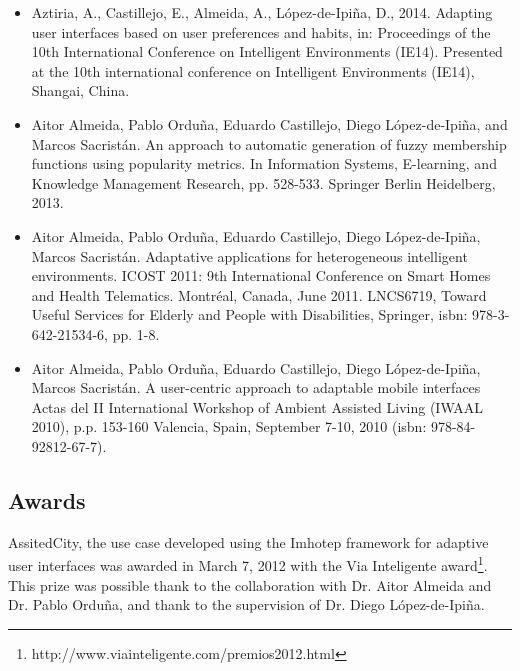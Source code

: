 \begin{itemize}
  \item Aztiria, A., Castillejo, E., Almeida, A., {López-de-Ipiña}, D., 2014. 
  Adapting user interfaces based on user preferences and habits, in: 
  Proceedings of the 10th International Conference on Intelligent Environments 
  (IE14). Presented at the 10th international conference on Intelligent 
  Environments (IE14), Shangai, China.


  \item Aitor Almeida, Pablo Orduña, Eduardo Castillejo, Diego {López-de-Ipiña}, 
  and Marcos Sacristán. An approach to automatic generation of fuzzy 
  membership functions using popularity metrics. In Information Systems, 
  E-learning, and Knowledge Management Research, pp. 528-533. Springer Berlin 
  Heidelberg, 2013.
  
  \item Aitor Almeida, Pablo Orduña, Eduardo Castillejo, Diego {López-de-Ipiña}, 
  Marcos Sacristán. Adaptative applications for heterogeneous intelligent 
  environments. ICOST 2011: 9th International Conference on Smart Homes and 
  Health Telematics. Montréal, Canada, June 2011. LNCS6719, Toward Useful 
  Services for Elderly and People with Disabilities, Springer, \ac{isbn}: 
  978-3-642-21534-6, pp. 1-8.
  
  \item Aitor Almeida, Pablo Orduña, Eduardo Castillejo, Diego {López-de-Ipiña}, 
  Marcos Sacristán. A user-centric approach to adaptable mobile interfaces 
  Actas del II International Workshop of Ambient Assisted Living (IWAAL 2010), 
  p.p. 153-160 Valencia, Spain, September 7-10, 2010 (\ac{isbn}: 978-84-92812-67-7).
\end{itemize}


\subsection{Awards}
\label{sec:awards}

AssitedCity, the use case developed using the Imhotep framework for adaptive
user interfaces was awarded in March 7, 2012 with the Via Inteligente 
award\footnote{http://www.viainteligente.com/premios2012.html}. This prize was 
possible thank to the collaboration with Dr. Aitor Almeida and Dr. Pablo Orduña, 
and thank to the supervision of Dr. Diego López-de-Ipiña. 


